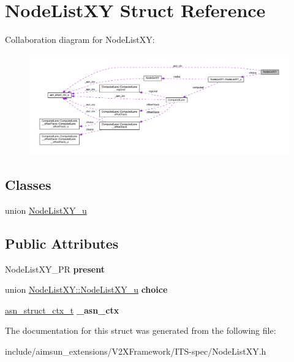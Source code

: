 \hypertarget{structNodeListXY}{}\section{Node\+List\+XY Struct Reference}
\label{structNodeListXY}


Collaboration diagram for Node\+List\+XY\+:\nopagebreak
\begin{figure}[H]
\begin{center}
\leavevmode
\includegraphics[width=350pt]{structNodeListXY__coll__graph}
\end{center}
\end{figure}
\subsection*{Classes}
\begin{DoxyCompactItemize}
\item 
union \hyperlink{unionNodeListXY_1_1NodeListXY__u}{Node\+List\+X\+Y\+\_\+u}
\end{DoxyCompactItemize}
\subsection*{Public Attributes}
\begin{DoxyCompactItemize}
\item 
Node\+List\+X\+Y\+\_\+\+PR {\bfseries present}\hypertarget{structNodeListXY_a872ab151607a38637834ad908b769b54}{}\label{structNodeListXY_a872ab151607a38637834ad908b769b54}

\item 
union \hyperlink{unionNodeListXY_1_1NodeListXY__u}{Node\+List\+X\+Y\+::\+Node\+List\+X\+Y\+\_\+u} {\bfseries choice}\hypertarget{structNodeListXY_a5b265827752c4b6ea5d85dc365e64090}{}\label{structNodeListXY_a5b265827752c4b6ea5d85dc365e64090}

\item 
\hyperlink{structasn__struct__ctx__s}{asn\+\_\+struct\+\_\+ctx\+\_\+t} {\bfseries \+\_\+asn\+\_\+ctx}\hypertarget{structNodeListXY_adeb967a137e418cb1559440c00bb76df}{}\label{structNodeListXY_adeb967a137e418cb1559440c00bb76df}

\end{DoxyCompactItemize}


The documentation for this struct was generated from the following file\+:\begin{DoxyCompactItemize}
\item 
include/aimsun\+\_\+extensions/\+V2\+X\+Framework/\+I\+T\+S-\/spec/Node\+List\+X\+Y.\+h\end{DoxyCompactItemize}
